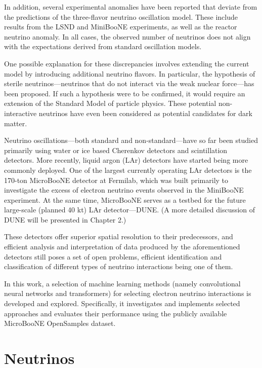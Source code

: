 \documentclass{pracalicmgr}
\begin{document}
In addition, several experimental anomalies have been reported that deviate from the predictions of the three-flavor neutrino oscillation model. These include results from the LSND and MiniBooNE experiments, as well as the reactor neutrino anomaly. In all cases, the observed number of neutrinos does not align with the expectations derived from standard oscillation models\cite{neutrinoAnomally}.

One possible explanation for these discrepancies involves extending the current model by introducing additional neutrino flavors. In particular, the hypothesis of sterile neutrinos—neutrinos that do not interact via the weak nuclear force—has been proposed. If such a hypothesis were to be confirmed, it would require an extension of the Standard Model of particle physics. These potential non-interactive neutrinos have even been considered as potential candidates for dark matter\cite{neutrinoDarkMatter}.

Neutrino oscillations—both standard and non-standard—have so far been studied primarily using water or ice based Cherenkov detectors and scintillation detectors. More recently, liquid argon (LAr) detectors have started being more commonly deployed. One of the largest currently operating LAr detectors is the 170-ton MicroBooNE detector at Fermilab, which was built primarily to investigate the excess of electron neutrino events observed in the MiniBooNE experiment. At the same time, MicroBooNE serves as a testbed for the future large-scale (planned 40 kt) LAr detector—DUNE. (A more detailed discussion of DUNE will be presented in Chapter 2.)

These detectors offer superior spatial resolution to their predecessors, and efficient analysis and interpretation of data produced by the aforementioned detectors still poses a set of open problems, efficient 
identification and classification of different types of neutrino interactions being one of them. 

In this work, a selection of machine learning methods (namely convolutional neural networks and transformers) for selecting electron neutrino interactions is developed and explored. Specifically, it investigates and implements selected approaches and evaluates their performance using the publicly available MicroBooNE OpenSamples dataset.

\chapter{Neutrinos}
\end{document}
